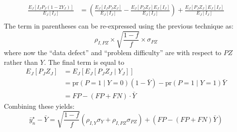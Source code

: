 \documentclass[11pt]{amsart}
\numberwithin{equation}{section}
\theoremstyle{plain}
\def\pr{\text{pr}}
\begin{document}
$$
\begin{aligned}
\frac{E_J \left[ I_J P_J (1-2Y_J) \right]}{E_J [ I_J ] } &= \left( \frac{E_J \left[ I_J P_J Z_J \right]}{E_J [ I_J ] } -  \frac{E_J \left[ P_J Z_J \right] E_J[ I_J]}{E_J [ I_J ] } \right) +  \frac{E_J \left[ P_J Z_J \right] E_J[ I_J]}{E_J [ I_J ] } \\
\end{aligned}
$$
The term in parentheses can be re-expressed using the previous technique as:
$$
\rho_{I, PZ} \times \sqrt{\frac{1-f}{f}} \times \sigma_{PZ}
$$
where now the ``data defect'' and ``problem difficulty'' are with respect to $PZ$ rather than $Y$. The final term is equal to
$$
\begin{aligned}
E_J [P_J Z_J ] &= E_J [ E_J [ P_J Z_J \mid Y_J ] ] \\
&= \pr (P = 1 \mid Y = 0) (1-\bar Y) - \pr(P=1 \mid Y = 1) \bar Y \\
&= FP - (FP + FN) \cdot \bar Y
\end{aligned}
$$
Combining these yields:
$$
\bar y_n^\star - \bar Y = \sqrt{\frac{1-f}{f}} \left(\rho_{I,Y} \sigma_Y + \rho_{I, PZ} \sigma_{PZ} \right) + \left( FP - (FP+FN) \bar Y \right)
$$
\end{document}
